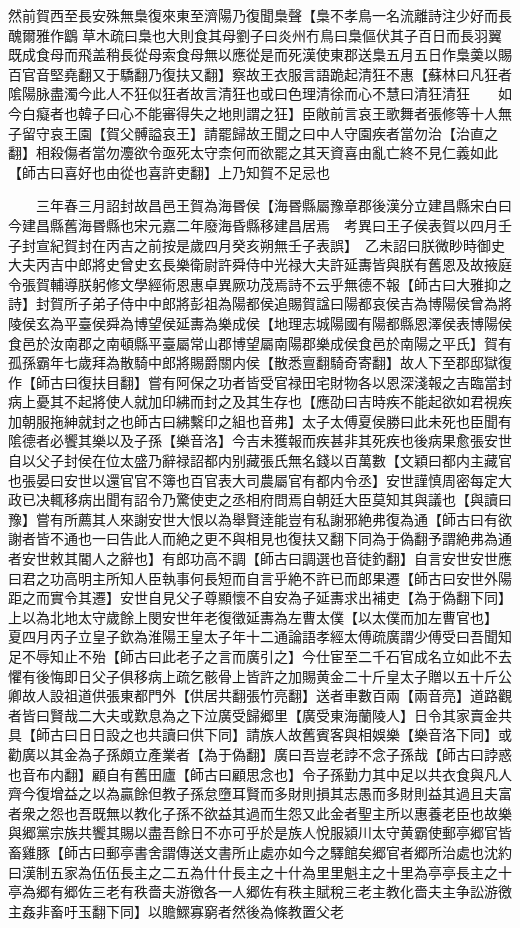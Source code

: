 然前賀西至長安殊無梟復來東至濟陽乃復聞梟聲【梟不孝鳥一名流離詩注少好而長醜爾雅作鶹草木疏曰梟也大則食其母劉子曰炎州冇鳥曰梟傴伏其子百日而長羽翼既成食母而飛盖稍長從母索食母無以應從是而死漢使東郡送梟五月五日作梟羮以賜百官音堅堯翻又于驕翻乃復扶又翻】察故王衣服言語跪起清狂不惠【蘇林曰凡狂者隂陽脉盡濁今此人不狂似狂者故言清狂也或曰色理清徐而心不慧曰清狂清狂　　如今白癡者也韓子曰心不能審得失之地則謂之狂】臣敞前言哀王歌舞者張修等十人無子留守哀王園【賀父髆謚哀王】請罷歸故王聞之曰中人守園疾者當勿治【治直之翻】相殺傷者當勿灋欲令亟死太守柰何而欲罷之其天資喜由亂亡終不見仁義如此【師古曰喜好也由從也喜許吏翻】上乃知賀不足忌也

　　三年春三月詔封故昌邑王賀為海昬侯【海昬縣屬豫章郡後漢分立建昌縣宋白曰今建昌縣舊海昬縣也宋元嘉二年廢海昏縣移建昌居焉　考異曰王子侯表賀以四月壬子封宣紀賀封在丙吉之前按是歲四月癸亥朔無壬子表誤】　乙未詔曰朕微眇時御史大夫丙吉中郎將史曾史玄長樂衛尉許舜侍中光禄大夫許延夀皆與朕有舊恩及故掖庭令張賀輔導朕躬修文學經術恩惠卓異厥功茂焉詩不云乎無德不報【師古曰大雅抑之詩】封賀所子弟子侍中中郎將彭祖為陽都侯追賜賀諡曰陽都哀侯吉為博陽侯曾為將陵侯玄為平臺侯舜為博望侯延夀為樂成侯【地理志城陽國有陽都縣恩澤侯表博陽侯食邑於汝南郡之南頓縣平臺屬常山郡博望屬南陽郡樂成侯食邑於南陽之平氏】賀有孤孫霸年七歲拜為散騎中郎將賜爵關内侯【散悉亶翻騎奇寄翻】故人下至郡邸獄復作【師古曰復扶目翻】嘗有阿保之功者皆受官禄田宅財物各以恩深淺報之吉臨當封病上憂其不起將使人就加印紼而封之及其生存也【應劭曰吉時疾不能起欲如君視疾加朝服拖紳就封之也師古曰紼繫印之組也音弗】太子太傅夏侯勝曰此未死也臣聞有隂德者必饗其樂以及子孫【樂音洛】今吉未獲報而疾甚非其死疾也後病果愈張安世自以父子封侯在位太盛乃辭禄詔都内别藏張氏無名錢以百萬數【文穎曰都内主藏官也張晏曰安世以還官官不簿也百官表大司農屬官有都内令丞】安世謹慎周密每定大政已决輒移病出聞有詔令乃驚使吏之丞相府問焉自朝廷大臣莫知其與議也【與讀曰豫】嘗有所薦其人來謝安世大恨以為舉賢逹能豈有私謝邪絶弗復為通【師古曰有欲謝者皆不通也一曰告此人而絶之更不與相見也復扶又翻下同為于偽翻予謂絶弗為通者安世敕其閽人之辭也】有郎功高不調【師古曰調選也音徒釣翻】自言安世安世應曰君之功高明主所知人臣執事何長短而自言乎絶不許已而郎果遷【師古曰安世外陽距之而實令其遷】安世自見父子尊顯懷不自安為子延夀求出補吏【為于偽翻下同】上以為北地太守歲餘上閔安世年老復徵延夀為左曹太僕【以太僕而加左曹官也】　夏四月丙子立皇子欽為淮陽王皇太子年十二通論語孝經太傅疏廣謂少傅受曰吾聞知足不辱知止不殆【師古曰此老子之言而廣引之】今仕宦至二千石官成名立如此不去懼有後悔即日父子俱移病上疏乞骸骨上皆許之加賜黄金二十斤皇太子贈以五十斤公卿故人設祖道供張東都門外【供居共翻張竹亮翻】送者車數百兩【兩音亮】道路觀者皆曰賢哉二大夫或歎息為之下泣廣受歸郷里【廣受東海蘭陵人】日令其家賣金共具【師古曰日日設之也共讀曰供下同】請族人故舊賓客與相娛樂【樂音洛下同】或勸廣以其金為子孫頗立產業者【為于偽翻】廣曰吾豈老誖不念子孫哉【師古曰誖惑也音布内翻】顧自有舊田廬【師古曰顧思念也】令子孫勤力其中足以共衣食與凡人齊今復增益之以為贏餘但教子孫怠墮耳賢而多財則損其志愚而多財則益其過且夫富者衆之怨也吾既無以教化子孫不欲益其過而生怨又此金者聖主所以惠養老臣也故樂與郷黨宗族共饗其賜以盡吾餘日不亦可乎於是族人悅服潁川太守黄霸使郵亭郷官皆畜雞豚【師古曰郵亭書舍謂傳送文書所止處亦如今之驛館矣郷官者郷所治處也沈約曰漢制五家為伍伍長主之二五為什什長主之十什為里里魁主之十里為亭亭長主之十亭為郷有郷佐三老有秩嗇夫游徼各一人郷佐有秩主賦稅三老主教化嗇夫主争訟游徼主姦非畜吁玉翻下同】以贍鰥寡窮者然後為條教置父老